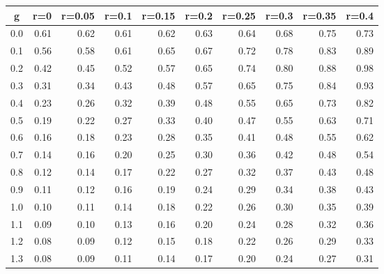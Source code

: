 %
\begin{table}[!tbp]
 \begin{center}
 \begin{tabular}{rrrrrrrrrr}\hline\hline
\multicolumn{1}{c}{g}&\multicolumn{1}{c}{r=0}&\multicolumn{1}{c}{r=0.05}&\multicolumn{1}{c}{r=0.1}&\multicolumn{1}{c}{r=0.15}&\multicolumn{1}{c}{r=0.2}&\multicolumn{1}{c}{r=0.25}&\multicolumn{1}{c}{r=0.3}&\multicolumn{1}{c}{r=0.35}&\multicolumn{1}{c}{r=0.4}\tabularnewline
\hline
0.0&0.61&0.62&0.61&0.62&0.63&0.64&0.68&0.75&0.73\tabularnewline
0.1&0.56&0.58&0.61&0.65&0.67&0.72&0.78&0.83&0.89\tabularnewline
0.2&0.42&0.45&0.52&0.57&0.65&0.74&0.80&0.88&0.98\tabularnewline
0.3&0.31&0.34&0.43&0.48&0.57&0.65&0.75&0.84&0.93\tabularnewline
0.4&0.23&0.26&0.32&0.39&0.48&0.55&0.65&0.73&0.82\tabularnewline
0.5&0.19&0.22&0.27&0.33&0.40&0.47&0.55&0.63&0.71\tabularnewline
0.6&0.16&0.18&0.23&0.28&0.35&0.41&0.48&0.55&0.62\tabularnewline
0.7&0.14&0.16&0.20&0.25&0.30&0.36&0.42&0.48&0.54\tabularnewline
0.8&0.12&0.14&0.17&0.22&0.27&0.32&0.37&0.43&0.48\tabularnewline
0.9&0.11&0.12&0.16&0.19&0.24&0.29&0.34&0.38&0.43\tabularnewline
1.0&0.10&0.11&0.14&0.18&0.22&0.26&0.30&0.35&0.39\tabularnewline
1.1&0.09&0.10&0.13&0.16&0.20&0.24&0.28&0.32&0.36\tabularnewline
1.2&0.08&0.09&0.12&0.15&0.18&0.22&0.26&0.29&0.33\tabularnewline
1.3&0.08&0.09&0.11&0.14&0.17&0.20&0.24&0.27&0.31\tabularnewline
\hline
\end{tabular}

\end{center}

\end{table}

